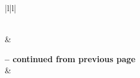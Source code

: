\begin{center}
\begin{longtable}{|l|l|}
\caption{Состав работ и стадии разработки ПК} \label{tab:eco1} \\ \hline
{}    &    \\ \hline
\endfirsthead

{{\bfseries \tablename \thetable{} -- continued from previous page}} \\
\hline {} &
 \\ \hline 
\endhead

 \\ %
\endfoot


\end{longtable}
\end{center}
